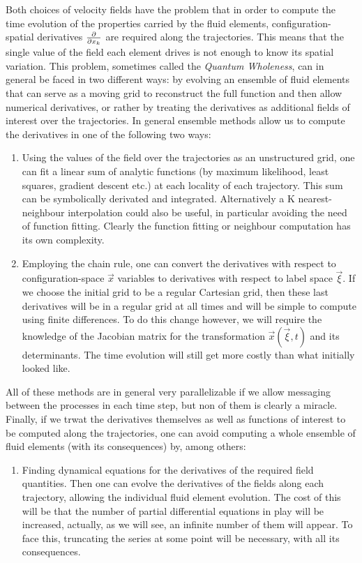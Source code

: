 \documentclass[11pt, a4paper]{article} %
\begin{document}
\begin{enumerate}
Both choices of velocity fields have the problem that in order to compute the time evolution of the properties carried by the fluid elements, configuration-spatial derivatives $\pdv{}{x_k}$ are required along the trajectories. This means that the single value of the field each element drives is not enough to know its spatial variation. This problem, sometimes called the {\em Quantum Wholeness}, can in general be faced in two different ways: by evolving an ensemble of fluid elements that can serve as a moving grid to reconstruct the full function and then allow numerical derivatives, or rather by treating the derivatives as additional fields of interest over the trajectories. In general ensemble methods allow us to compute the derivatives in one of the following two ways:

\begin{enumerate}
\item Using the values of the field over the trajectories as an unstructured grid, one can fit a linear sum of analytic functions (by maximum likelihood, least squares, gradient descent etc.) at each locality of each trajectory. This sum can be symbolically derivated and integrated. Alternatively a K nearest-neighbour interpolation could also be useful, in particular avoiding the need of function fitting. Clearly the function fitting or neighbour computation has its own complexity.

\item Employing the chain rule, one can convert the derivatives with respect to configuration-space $\vec{x}$ variables to derivatives with respect to label space $\vec{\xi}$. If we choose the initial grid to be a regular Cartesian grid, then these last derivatives will be in a regular grid at all times and will be simple to compute using finite differences. To do this change however, we will require the knowledge of the Jacobian matrix for the transformation $\vec{x}(\vec{\xi},t)$ and its determinants. The time evolution will still get more costly than what initially looked like.

\end{enumerate}
All of these methods are in general very parallelizable if we allow messaging between the processes in each time step, but non of them is clearly a miracle. Finally, if we trwat the derivatives themselves as well as functions of interest to be computed along the trajectories, one can avoid computing a whole ensemble of fluid elements (with its consequences) by, among others:
\begin{enumerate}
\item Finding dynamical equations for the derivatives of the required field quantities. Then one can evolve the derivatives of the fields along each trajectory, allowing the individual fluid element evolution. The cost of this will be that the number of partial differential equations in play will be increased, actually, as we will see, an infinite number of them will appear. To face this, truncating the series at some point will be necessary, with all its consequences.


\end{enumerate}
\end{enumerate}
\end{document}
